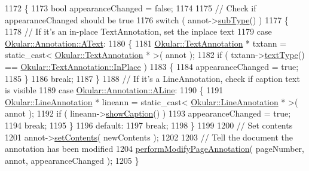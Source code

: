\begin{DoxyCode}
1172 \{
1173     \textcolor{keywordtype}{bool} appearanceChanged = \textcolor{keyword}{false};
1174 
1175     \textcolor{comment}{// Check if appearanceChanged should be true}
1176     \textcolor{keywordflow}{switch} ( annot->\hyperlink{classOkular_1_1Annotation_af9833449767eacd740f377e69a1fdd48}{subType}() )
1177     \{
1178         \textcolor{comment}{// If it's an in-place TextAnnotation, set the inplace text}
1179         \textcolor{keywordflow}{case} \hyperlink{classOkular_1_1Annotation_af71b46e37d5f850b97d5c4de3be9aac0a48f93d5a9352abc4e38a45f69075e504}{Okular::Annotation::AText}:
1180         \{
1181             \hyperlink{classOkular_1_1TextAnnotation}{Okular::TextAnnotation} * txtann = \textcolor{keyword}{static\_cast<} 
      \hyperlink{classOkular_1_1TextAnnotation}{Okular::TextAnnotation} * \textcolor{keyword}{>}( annot );
1182             \textcolor{keywordflow}{if} ( txtann->\hyperlink{classOkular_1_1TextAnnotation_acf75a9a22542d3008a486298972e6dcf}{textType}() == \hyperlink{classOkular_1_1TextAnnotation_af560204454bf812797bc95bea730b06ea2a746e9125e8cf53627335a8af01b998}{Okular::TextAnnotation::InPlace}
       )
1183             \{
1184                 appearanceChanged = \textcolor{keyword}{true};
1185             \}
1186             \textcolor{keywordflow}{break};
1187         \}
1188         \textcolor{comment}{// If it's a LineAnnotation, check if caption text is visible}
1189         \textcolor{keywordflow}{case} \hyperlink{classOkular_1_1Annotation_af71b46e37d5f850b97d5c4de3be9aac0a7035dc978d8b79958f34e3d164838726}{Okular::Annotation::ALine}:
1190         \{
1191             \hyperlink{classOkular_1_1LineAnnotation}{Okular::LineAnnotation} * lineann = \textcolor{keyword}{static\_cast<} 
      \hyperlink{classOkular_1_1LineAnnotation}{Okular::LineAnnotation} * \textcolor{keyword}{>}( annot );
1192             \textcolor{keywordflow}{if} ( lineann->\hyperlink{classOkular_1_1LineAnnotation_a29a1ebda3306c7a928c6f94e160cb9de}{showCaption}() )
1193                 appearanceChanged = \textcolor{keyword}{true};
1194             \textcolor{keywordflow}{break};
1195         \}
1196         \textcolor{keywordflow}{default}:
1197             \textcolor{keywordflow}{break};
1198     \}
1199 
1200     \textcolor{comment}{// Set contents}
1201     annot->\hyperlink{classOkular_1_1Annotation_a65a7316062031c6fdf578835245ddbd1}{setContents}( newContents );
1202 
1203     \textcolor{comment}{// Tell the document the annotation has been modified}
1204     \hyperlink{classOkular_1_1DocumentPrivate_ac6a83ec146be14eee48aa70ac02f7350}{performModifyPageAnnotation}( pageNumber,  annot, appearanceChanged );
1205 \}
\end{DoxyCode}
